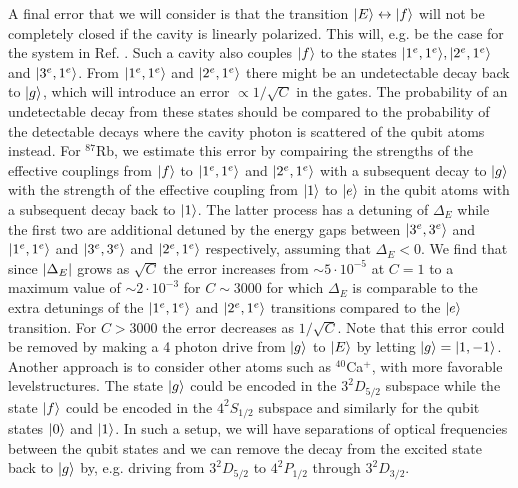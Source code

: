 A final error that we will consider is that the transition
$| E \rangle\leftrightarrow| f \rangle$ will not be completely closed if the cavity is
linearly polarized. This will, e.g. be the case for the system in Ref.
\cite{thompson}. Such a cavity also couples $| f \rangle$ to the states
$| 1^{e},1^{e} \rangle,| 2^{e},1^{e} \rangle$ and $| 3^{e},1^{e} \rangle$. From
$| 1^{e},1^{e} \rangle$ and $| 2^{e},1^{e} \rangle$ there might be an undetectable decay
back to $| g \rangle$, which will introduce an error $\propto1/\sqrt{C}$ in the
gates. The probability of an undetectable decay from these states should be
compared to the probability of the detectable decays where the cavity photon is
scattered of the qubit atoms instead. For ${}^{87}$Rb, we estimate this error by
compairing the strengths of the effective couplings from $| f \rangle$ to
$| 1^{e},1^{e} \rangle$ and $| 2^{e},1^{e} \rangle$ with a subsequent decay to $| g \rangle$
with the strength of the effective coupling from $| 1 \rangle$ to $| e \rangle$ in the
qubit atoms with a subsequent decay back to $| 1 \rangle$. The latter process has a
detuning of $\Delta_{E}$ while the first two are additional detuned by the
energy gaps between $| 3^{e},3^{e} \rangle$ and $| 1^{e},1^{e} \rangle$ and
$| 3^{e},3^{e} \rangle$ and $| 2^{e},1^{e} \rangle$ respectively, assuming that
$\Delta_{E}<0$. We find that since $\left| \Delta_{E} \right|$ grows as $\sqrt{C}$ the
error increases from $\sim5\cdot10^{-5}$ at $C=1$  to a maximum value of
$\sim2\cdot10^{-3}$ for $C\sim3000$ for which $\Delta_{E}$ is comparable to the
extra detunings of the $| 1^{e},1^{e} \rangle$ and $| 2^{e},1^{e} \rangle$ transitions
compared to the $| e \rangle$ transition. For $C>3000$ the error decreases as
$1/\sqrt{C}$.
Note that this error could be removed  by making a 4 photon drive from $| g \rangle$
to $| E \rangle$ by letting $| g \rangle=| 1,-1 \rangle$. Another approach is to consider
other atoms such as ${}^{40}$Ca${}^{+}$, with more favorable levelstructures.
The state $| g \rangle$ could be encoded in the $3^{2}D_{5/2}$ subspace while the
state $| f \rangle$ could be encoded in the $4^{2}S_{1/2}$ subspace and similarly
for the qubit states $| 0 \rangle$ and $| 1 \rangle$. In such a setup, we will have
separations of optical frequencies between the qubit states and we can remove
the decay from the excited state back to $| g \rangle$ by, e.g. driving from
$3^{2}D_{5/2}$ to $4^{2}P_{1/2}$ through $3^{2}D_{3/2}$.
